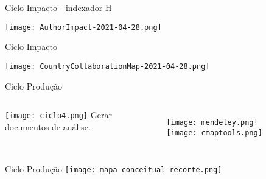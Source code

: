\begin{frame}[c]{Ciclo Impacto - indexador H}

    \centering
    \centerline{\texttt{[image: AuthorImpact-2021-04-28.png]}}

\end{frame}
\begin{frame}[c]{Ciclo Impacto}

    \centering
    \centerline{\texttt{[image: CountryCollaborationMap-2021-04-28.png]}}

\end{frame}
\begin{frame}[c]{Ciclo Produção}
    \begin{columns}
            \centering
            \texttt{[image: ciclo4.png]}
            Gerar documentos de análise.

            \centering
            \begin{figure}
                     \texttt{[image: mendeley.png]}
                     \hfill
                     \texttt{[image: cmaptools.png]}
            \end{figure}
        
    \end{columns}

\end{frame}
\begin{frame}[c]{Ciclo Produção}
    \centering
    \texttt{[image: mapa-conceitual-recorte.png]}

\end{frame}
